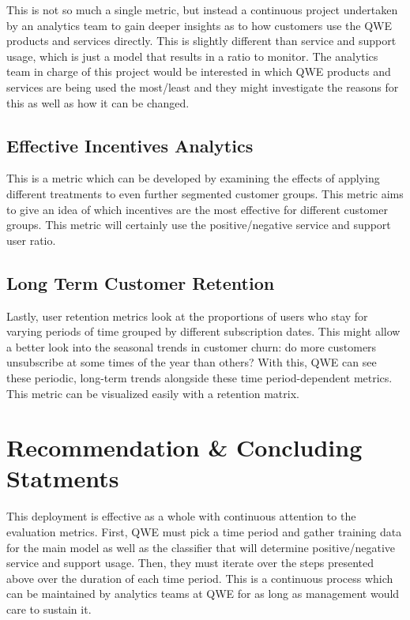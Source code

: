 \documentclass{article}
\begin{document}
	This is not so much a single metric, but instead a continuous project undertaken by an analytics team to gain deeper insights as to how customers use the QWE products and services directly. This is slightly different than service and support usage, which is just a model that results in a ratio to monitor. The analytics team in charge of this project would be interested in which QWE products and services are being used the most/least and they might investigate the reasons for this as well as how it can be changed.
	
	\subsection{Effective Incentives Analytics}
	
	This is a metric which can be developed by examining the effects of applying different treatments to even further segmented customer groups. This metric aims to give an idea of which incentives are the most effective for different customer groups. This metric will certainly use the positive/negative service and support user ratio.
	
	\subsection{Long Term Customer Retention}
	
	Lastly, user retention metrics look at the proportions of users who stay for varying periods of time grouped by different subscription dates. This might allow a better look into the seasonal trends in customer churn: do more customers unsubscribe at some times of the year than others? With this, QWE can see these periodic, long-term trends alongside these time period-dependent metrics. This metric can be visualized easily with a retention matrix.
	
	\section{Recommendation \& Concluding Statments}
	
	This deployment is effective as a whole with continuous attention to the evaluation metrics. First, QWE must pick a time period and gather training data for the main model as well as the classifier that will determine positive/negative service and support usage. Then, they must iterate over the steps presented above over the duration of each time period. This is a continuous process which can be maintained by analytics teams at QWE for as long as management would care to sustain it. 
\end{document}
